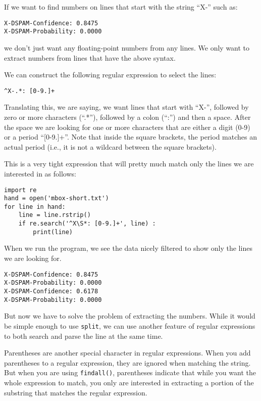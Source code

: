 If we want to find numbers on lines that start with the string ``X-'' such as:

\beforeverb
\begin{verbatim}
X-DSPAM-Confidence: 0.8475
X-DSPAM-Probability: 0.0000  
\end{verbatim}
\afterverb
%
we don't just want any floating-point numbers from any lines.  We only want to extract
numbers from lines that have the above syntax.

We can construct the following regular expression to select the lines:

\beforeverb
\begin{verbatim}
^X-.*: [0-9.]+
\end{verbatim}
\afterverb
%
Translating this, we are saying, we want lines that start with ``X-'', followed by zero or
more characters (``.*''), followed by a colon (``:'') and then a space.  After the space we are
looking for one or more characters that are either a digit (0-9) or a period ``[0-9.]+''.
Note that inside the square brackets, the period matches an actual period (i.e., it is not a
wildcard between the square brackets).

This is a very tight expression that will pretty much match only the lines we are interested
in as follows:

\beforeverb
\begin{verbatim}
import re
hand = open('mbox-short.txt')
for line in hand:
    line = line.rstrip()
    if re.search('^X\S*: [0-9.]+', line) :
        print(line)
\end{verbatim}
\afterverb
%
When we run the program, we see the data nicely filtered to show 
only the lines we are looking for.

\beforeverb
\begin{verbatim}
X-DSPAM-Confidence: 0.8475
X-DSPAM-Probability: 0.0000
X-DSPAM-Confidence: 0.6178
X-DSPAM-Probability: 0.0000
\end{verbatim}
\afterverb
%
But now we have to solve the problem of extracting the numbers.  While it would be simple
enough to use {\tt split}, we can use another feature of regular expressions to both search
and parse the line at the same time.

Parentheses are another special character in regular expressions.  When you add parentheses
to a regular expression, they are ignored when matching the string. But when you are using
{\tt findall()}, parentheses indicate that while you want the whole expression to match,
you only are interested in extracting a portion of the substring that matches the regular
expression.  

